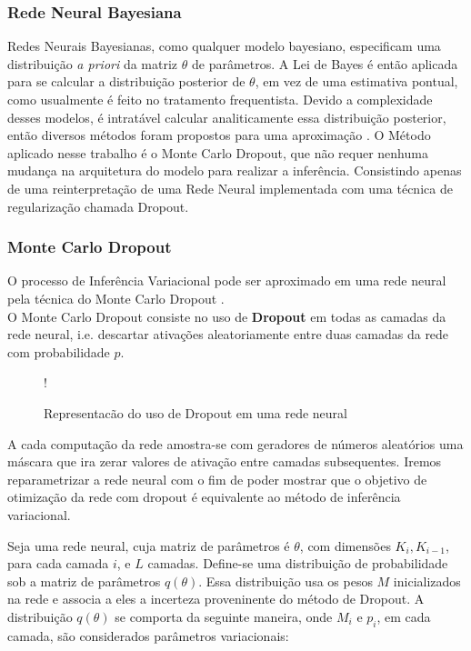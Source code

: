 \subsubsection{Rede Neural Bayesiana}

Redes Neurais Bayesianas, como qualquer modelo bayesiano, especificam uma distribuição \textit{a priori} da matriz $\theta$ de parâmetros.
A Lei de Bayes é então aplicada para se calcular a distribuição posterior de
$\theta$, em vez de uma estimativa pontual, como usualmente é feito no tratamento frequentista.
Devido a complexidade desses modelos, é intratável calcular analiticamente essa distribuição posterior, então diversos métodos foram propostos para uma aproximação \citep{Gal2016Uncertainty}.
O Método aplicado nesse trabalho é o Monte Carlo Dropout, que não requer nenhuma mudança na arquitetura do modelo para realizar a inferência. Consistindo apenas de uma reinterpretação de uma Rede Neural implementada com uma técnica de regularização chamada Dropout. 

\subsubsection{Monte Carlo Dropout}

O processo de Inferência Variacional pode ser aproximado em uma rede neural pela técnica do Monte Carlo Dropout \citep{dropbayes}. \\

O Monte Carlo Dropout consiste no uso de \textbf{Dropout} em todas as camadas da rede
neural, i.e. descartar ativações aleatoriamente entre duas camadas da rede com
probabilidade $p$.\\

\begin{figure}
  \centering
  \resizebox {\columnwidth} {!} {}
  \label{fig:dropout}
  \caption{Representacão do uso de Dropout em uma rede neural}
\end{figure}


A cada computação da rede amostra-se com geradores de números aleatórios uma
máscara que ira zerar valores de ativação entre camadas subsequentes. Iremos
reparametrizar a rede neural com o fim de poder mostrar que o objetivo de
otimização da rede com dropout é equivalente ao método de inferência variacional.

Seja uma rede neural, cuja matriz de parâmetros é $\theta$, com dimensões
$K_i,K_{i-1}$, para cada camada $i$, e $L$ camadas. Define-se uma distribuição
de probabilidade sob a matriz de parâmetros $q(\theta)$.
Essa distribuição usa os pesos $M$ inicializados na rede e associa a eles a incerteza proveninente do
método de Dropout. A distribuição $q(\theta)$ se comporta da seguinte maneira,
onde $M_i$ e $p_i$, em cada camada, são considerados parâmetros variacionais:

